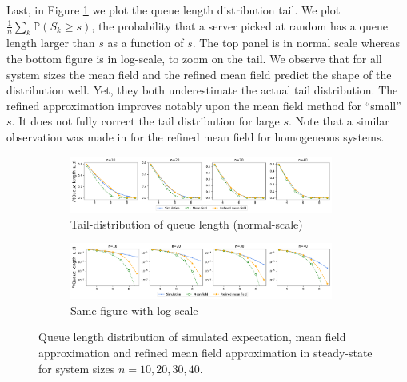 \documentclass[acmsmall]{acmart}
\newcommand\Proba[1]{\mathbb{P}\left(#1\right)} %
\begin{document}
Last, in Figure \ref{fig:queue_len_distr} we plot the queue length distribution tail. We plot $\frac1n\sum_{k}\Proba{S_k\ge s}$, the probability that a server picked at random has a queue length larger than $s$ as a function of $s$.  The top panel is in normal scale whereas the bottom figure is in log-scale, to zoom on the tail. We observe that for all system sizes the mean field and the refined mean field predict the shape of the distribution well. Yet, they both underestimate the actual tail distribution. The refined approximation improves notably upon the mean field method for ``small'' $s$. It does not fully correct the tail distribution for large $s$. Note that a similar observation was made in \cite{gastRefinedMeanField2017} for the refined mean field for homogeneous systems. 

\begin{figure}[ht]
  \begin{subfigure}{\linewidth}
    \includegraphics[width=0.95\textwidth]{tail_distribution}
    \caption{Tail-distribution of queue length (normal-scale)}
  \end{subfigure}
  \begin{subfigure}{\linewidth}
    \includegraphics[width=0.95\textwidth]{tail_distribution_log}
    \caption{Same figure with log-scale}
  \end{subfigure}
  \caption{Queue length distribution of simulated expectation, mean field approximation and refined mean field approximation in steady-state for system sizes $n=10,20,30,40$. }
  \label{fig:queue_len_distr}
\end{figure}
  
\end{document}
